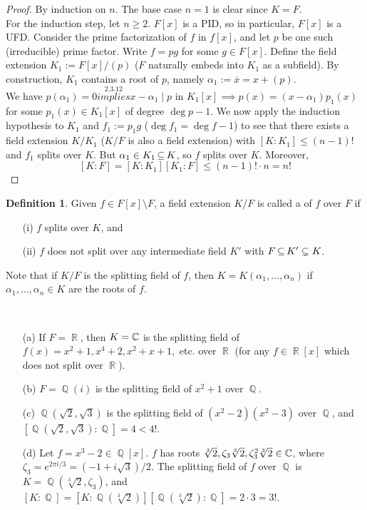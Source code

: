 \documentclass[11pt]{book}
\theoremstyle{definition}   \newtheorem{defn}[counter]{Definition} %
\newcommand{\ov}{\overline}   \newcommand{\wt}{\widetilde}
\newcommand{\bs}{\setminus}   \newcommand{\A}{\mathcal{A}}   \newcommand{\sy}{\textnormal{Syl}}   \newcommand{\size}[1]{\left| #1 \right|}
\DeclareMathOperator{\R}{\mathbb{R}}   \DeclareMathOperator{\N}{\mathbb{N}}   \DeclareMathOperator{\z}{\mathbb{Z}}   \DeclareMathOperator{\Q}{\mathbb{Q}}
\newcommand{\vs}{\vspace{8pt}}
\numberwithin{counter}{chapter}
\begin{document}
\begin{proof}
By induction on $n$. The base case $n=1$ is clear since $K = F$. \\

For the induction step, let $n \geq 2$. $F[x]$ is a PID, so in particular, $F[x]$ is a UFD. Consider the prime factorization of $f$ in $f[x]$, and let $p$ be one such (irreducible) prime factor. Write $f = p g$ for some $g \in F[x]$. Define the field extension $K_1 := F[x]/(p)$ ($F$ naturally embeds into $K_1$ as a subfield). By construction, $K_1$ contains a root of $p$, namely $\alpha_1 := \ov{x} = x + (p)$. \\

We have $p(\alpha_1) = 0 \overset{2.3.12}{implies} x-\alpha_1 \mid p$ in $K_1[x] \implies p(x) = (x-\alpha_1) p_1(x)$ for some $p_1(x) \in K_1[x]$ of degree $\deg p - 1$. We now apply the induction hypothesis to $K_1$ and $f_1 := p_1 g$ ($\deg f_1 = \deg f - 1$) to see that there exists a field extension $K/K_1$ ($K/F$ is also a field extension) with $[K : K_1] \leq (n-1)!$ and $f_1$ splits over $K$. But $\alpha_1 \in K_1 \operatorname{\subseteq} K$, so $f$ splits over $K$. Moreover, 
	\[[K : F] = [K : K_1] [K_1 : F] \leq (n-1)! \cdot n = n! \]
\end{proof}

\vs

\begin{defn}
Given $f \in F[x] \bs F$, a field extension $K/F$ is called a  of $f$ over $F$ if
\begin{enumerate}
\item[(i)] $f$ splits over $K$, and
\item[(ii)] $f$ does not split over any intermediate field $K'$ with $F \operatorname{\subseteq} K' \subsetneq K$.
\end{enumerate}
Note that if $K/F$ is the splitting field of $f$, then $K = K(\alpha_1,\dots,\alpha_n)$ if $\alpha_1,\dots,\alpha_n \in K$ are the roots of $f$.  
\end{defn}

\vs

\begin{example}\ 
\begin{enumerate}
\item[(a)] If $F = \R$, then $K = \operatorname{\mathbb{C}}$ is the splitting field of $f(x) = x^2+1, x^4+2, x^2+x+1,$ etc. over $\R$ (for any $f \in \R[x]$ which does not split over $\R$). 
\item[(b)] $F = \Q(i)$ is the splitting field of $x^2 + 1$ over $\Q$. 
\item[(c)] $\Q(\sqrt{2},\sqrt{3})$ is the splitting field of $(x^2-2)(x^2-3)$ over $\Q$, and $[\Q(\sqrt{2},\sqrt{3}) : \Q] = 4 < 4!$. 
\item[(d)] Let $f = x^3-2 \in \Q[x]$. $f$ has roots $\sqrt[3]{2}, \zeta_3 \sqrt[3]{2}, \zeta_3^2 \sqrt[3]{2} \in \operatorname{\mathbb{C}}$, where \\ $\zeta_3 = e^{2 \pi i/3} =(-1 + i \sqrt{3})/2$. The splitting field of $f$ over $\Q$ is $K = \Q(\sqrt[3]{2},\zeta_3)$, and \\ $[K : \Q] = [K : \Q(\sqrt[3]{2})] [\Q(\sqrt[3]{2}) : \Q] = 2 \cdot 3 = 3!$. 
\end{enumerate}
\end{example}
\end{document}
